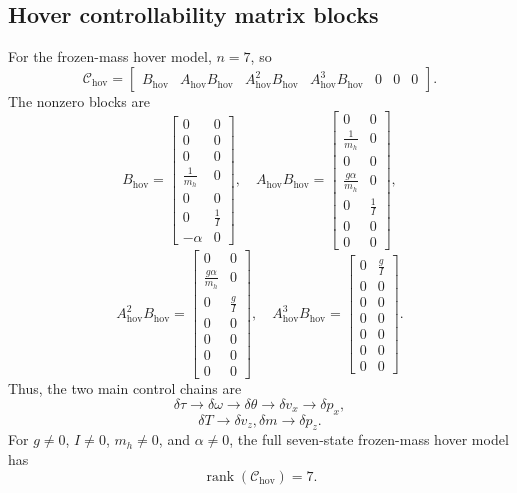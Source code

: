 \documentclass[10pt]{article}
\newcommand{\dd}{\delta}
\newcommand{\eps}{\omega}
\newcommand{\vphi}{\alpha}
\begin{document}
\subsection*{Hover controllability matrix blocks}
For the frozen-mass hover model, $n=7$, so
\[
    \mathcal C_{\mathrm{hov}}=
    \begin{bmatrix}
    B_{\mathrm{hov}}&A_{\mathrm{hov}}B_{\mathrm{hov}}&A_{\mathrm{hov}}^2B_{\mathrm{hov}}&A_{\mathrm{hov}}^3B_{\mathrm{hov}}&0&0&0
    \end{bmatrix}.
\]
The nonzero blocks are
{\small
\[
B_{\mathrm{hov}}=
\begin{bmatrix}
0&0\\0&0\\0&0\\\frac{1}{m_h}&0\\0&0\\0&\frac{1}{I}\\-\vphi&0
\end{bmatrix},
\quad
A_{\mathrm{hov}}B_{\mathrm{hov}}=
\begin{bmatrix}
0&0\\\frac{1}{m_h}&0\\0&0\\\frac{g\vphi}{m_h}&0\\0&\frac{1}{I}\\0&0\\0&0
\end{bmatrix},
\]
\[
A_{\mathrm{hov}}^2B_{\mathrm{hov}}=
\begin{bmatrix}
0&0\\\frac{g\vphi}{m_h}&0\\0&\frac{g}{I}\\0&0\\0&0\\0&0\\0&0
\end{bmatrix},
\quad
A_{\mathrm{hov}}^3B_{\mathrm{hov}}=
\begin{bmatrix}
0&\frac{g}{I}\\0&0\\0&0\\0&0\\0&0\\0&0\\0&0
\end{bmatrix}.
\]
}
Thus, the two main control chains are
\[
    \dd\tau \rightarrow \dd\eps \rightarrow \dd\theta \rightarrow \dd v_x \rightarrow \dd p_x,
\]
\[
    \dd T \rightarrow \dd v_z,\dd m \rightarrow \dd p_z.
\]
For $g\neq 0$, $I\neq0$, $m_h\neq0$, and $\vphi\neq0$, the full seven-state frozen-mass hover model has
\[
    \operatorname{rank}(\mathcal C_{\mathrm{hov}})=7.
\]
\end{document}
